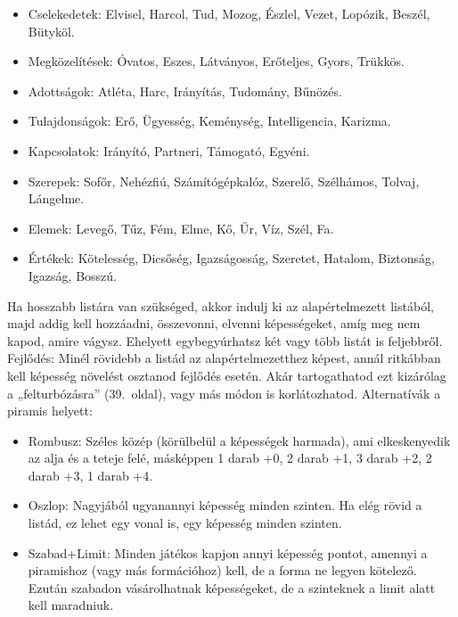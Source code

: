 \documentclass[oneside]{book}
\newcommand{\page}[1]{#1.~oldal}
\begin{document}
\begin{itemize}
    \item Cselekedetek: Elvisel, Harcol, Tud, Mozog, Észlel, Vezet, Lopózik, Beszél, Bütyköl.
    \item Megközelítések: Óvatos, Eszes, Látványos, Erőteljes, Gyors, Trükkös.
    \item Adottságok: Atléta, Harc, Irányítás, Tudomány, Bűnözés.
    \item Tulajdonságok: Erő, Ügyesség, Keménység, Intelligencia, Karizma.
    \item Kapcsolatok: Irányító, Partneri, Támogató, Egyéni.
    \item Szerepek: Sofőr, Nehézfiú, Számítógépkalóz, Szerelő, Szélhámos, Tolvaj, Lángelme.
    \item Elemek: Levegő, Tűz, Fém, Elme, Kő, Űr, Víz, Szél, Fa.
    \item Értékek: Kötelesség, Dicsőség, Igazságosság, Szeretet, Hatalom, Biztonság, Igazság, Bosszú.
\end{itemize}

Ha hosszabb listára van szükséged, akkor indulj ki az alapértelmezett listából, majd addig kell hozzáadni, összevonni, elvenni képességeket, amíg meg nem kapod, amire vágysz. Ehelyett egybegyúrhatsz két vagy több listát is feljebbről.
Fejlődés: Minél rövidebb a listád az alapértelmezetthez képest, annál ritkábban kell képesség növelést osztanod fejlődés esetén. Akár tartogathatod ezt kizárólag a „felturbózásra” (\page{39}), vagy más módon is korlátozhatod.
Alternatívák a piramis helyett:

\begin{itemize}
    \item Rombusz: Széles közép (körülbelül a képességek harmada), ami elkeskenyedik az alja és a teteje felé, másképpen 1 darab +0, 2 darab +1, 3 darab +2, 2 darab +3, 1 darab +4.
    \item Oszlop: Nagyjából ugyanannyi képesség minden szinten. Ha elég rövid a listád, ez lehet egy vonal is, egy képesség minden szinten.
    \item Szabad+Limit: Minden játékos kapjon annyi képesség pontot, amennyi a piramishoz (vagy más formációhoz) kell, de a forma ne legyen kötelező. Ezután szabadon vásárolhatnak képességeket, de a szinteknek a limit alatt kell maradniuk.
\end{itemize}
\end{document}
